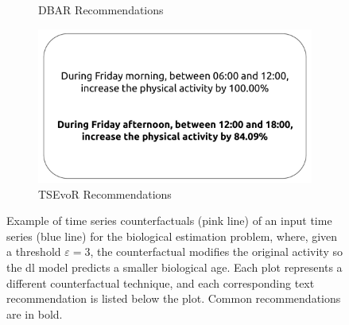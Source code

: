\begin{figure}[t]
\begin{subfigure}[b]{0.24\textwidth}
         \caption{DBAR Recommendations}
         \label{fig:reco:dba}
     \end{subfigure}
    \hfill
     \begin{subfigure}[b]{0.24\textwidth}
         \centering
         \includegraphics[width=\textwidth]{images/6306/2_6306_TCN_TSEvo_reco_bold.pdf}
         \caption{TSEvoR Recommendations}
         \label{fig:reco:tsevo}
     \end{subfigure}

    \caption{Example of time series counterfactuals (pink line) of an input time
series (blue line) for the biological estimation problem, where, given a threshold $\varepsilon=3$, the counterfactual modifies the original activity so the \gls{dl} model predicts a smaller biological age. Each plot represents a different counterfactual technique, and each corresponding text recommendation is listed below the plot. Common recommendations are in bold.}
    \label{fig:quali-eval}
\end{figure}